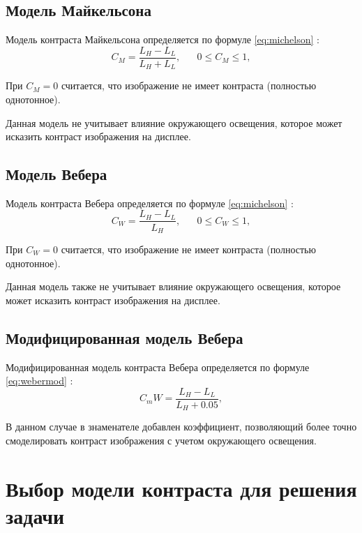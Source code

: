 \subsection{Модель Майкельсона}

Модель контраста Майкельсона определяется по формуле \ref{eq:michelson} \cite{weber}:
\begin{equation}
	\label{eq:michelson}
	C_M=\frac{L_H-L_L}{L_H+L_L}, \text{~~~~~$0 \le C_M \le 1$},
\end{equation}

При $C_M = 0$ считается, что изображение не имеет контраста (полностью однотонное).

Данная модель не учитывает влияние окружающего освещения, которое может исказить контраст изображения на дисплее.

\subsection{Модель Вебера}

Модель контраста Вебера определяется по формуле \ref{eq:michelson} \cite{weber}:
\begin{equation}
	\label{eq:weber}
	C_W=\frac{L_H-L_L}{L_H}, \text{~~~~~$0 \le C_W \le 1$},
\end{equation}

При $C_W = 0$ считается, что изображение не имеет контраста (полностью однотонное).

Данная модель также не учитывает влияние окружающего освещения, которое может исказить контраст изображения на дисплее.

\subsection{Модифицированная модель Вебера}

Модифицированная модель контраста Вебера определяется по формуле \ref{eq:webermod} \cite{weber}:
\begin{equation}
	\label{eq:webermod}
	C_mW=\frac{L_H-L_L}{L_H + 0.05},
\end{equation}

В данном случае в знаменателе добавлен коэффициент, позволяющий более точно смоделировать контраст изображения с учетом окружающего освещения.

\section{Выбор модели контраста для решения задачи}

